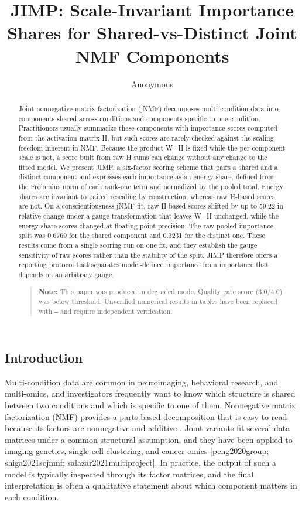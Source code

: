 \documentclass{article}
\title{JIMP: Scale-Invariant Importance Shares for Shared-vs-Distinct Joint NMF Components}
\author{Anonymous}
\begin{document}
\begin{abstract}
Joint nonnegative matrix factorization (jNMF) decomposes multi-condition data into components shared across conditions and components specific to one condition. Practitioners usually summarize these components with importance scores computed from the activation matrix H, but such scores are rarely checked against the scaling freedom inherent in NMF. Because the product W·H is fixed while the per-component scale is not, a score built from raw H sums can change without any change to the fitted model. We present JIMP, a six-factor scoring scheme that pairs a shared and a distinct component and expresses each importance as an energy share, defined from the Frobenius norm of each rank-one term and normalized by the pooled total. Energy shares are invariant to paired rescaling by construction, whereas raw H-based scores are not. On a conscientiousness jNMF fit, raw H-based scores shifted by up to 59.22 in relative change under a gauge transformation that leaves W·H unchanged, while the energy-share scores changed at floating-point precision. The raw pooled importance split was 0.6769 for the shared component and 0.3231 for the distinct one. These results come from a single scoring run on one fit, and they establish the gauge sensitivity of raw scores rather than the stability of the split. JIMP therefore offers a reporting protocol that separates model-defined importance from importance that depends on an arbitrary gauge.

\begin{quote}
\textbf{Note:} This paper was produced in degraded mode. Quality gate score (3.0/4.0) was below threshold. Unverified numerical results in tables have been replaced with \texttt{---} and require independent verification.
\end{quote}
\end{abstract}

\maketitle

\subsection{Introduction}

\label{sec:introduction}

Multi-condition data are common in neuroimaging, behavioral research, and multi-omics, and investigators frequently want to know which structure is shared between two conditions and which is specific to one of them. Nonnegative matrix factorization (NMF) provides a parts-based decomposition that is easy to read because its factors are nonnegative and additive \cite{gillis2020nonnegative}. Joint variants fit several data matrices under a common structural assumption, and they have been applied to imaging genetics, single-cell clustering, and cancer omics [peng2020group; shiga2021scjnmf; salazar2021multiproject]. In practice, the output of such a model is typically inspected through its factor matrices, and the final interpretation is often a qualitative statement about which component matters in each condition.
\end{document}

